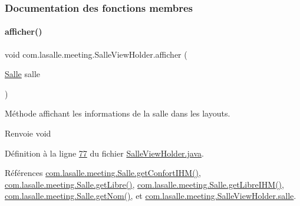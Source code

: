 \subsubsection{Documentation des fonctions membres}
\mbox{\label{classcom_1_1lasalle_1_1meeting_1_1_salle_view_holder_ac9f5e4bd25c8abc50ad524e0c2132304}} 
\paragraph{\texorpdfstring{afficher()}{afficher()}}
{\footnotesize\ttfamily void com.\+lasalle.\+meeting.\+Salle\+View\+Holder.\+afficher (\begin{DoxyParamCaption}\item[{\hyperlink{classcom_1_1lasalle_1_1meeting_1_1_salle}{Salle}}]{salle }\end{DoxyParamCaption})}



Méthode affichant les informations de la salle dans les layouts. 

\begin{DoxyReturn}{Renvoie}
void 
\end{DoxyReturn}


Définition à la ligne \hyperlink{_salle_view_holder_8java_source_l00077}{77} du fichier \hyperlink{_salle_view_holder_8java_source}{Salle\+View\+Holder.\+java}.



Références \hyperlink{_salle_8java_source_l00233}{com.\+lasalle.\+meeting.\+Salle.\+get\+Confort\+I\+H\+M()}, \hyperlink{_salle_8java_source_l00174}{com.\+lasalle.\+meeting.\+Salle.\+get\+Libre()}, \hyperlink{_salle_8java_source_l00199}{com.\+lasalle.\+meeting.\+Salle.\+get\+Libre\+I\+H\+M()}, \hyperlink{_salle_8java_source_l00165}{com.\+lasalle.\+meeting.\+Salle.\+get\+Nom()}, et \hyperlink{_salle_view_holder_8java_source_l00042}{com.\+lasalle.\+meeting.\+Salle\+View\+Holder.\+salle}.


